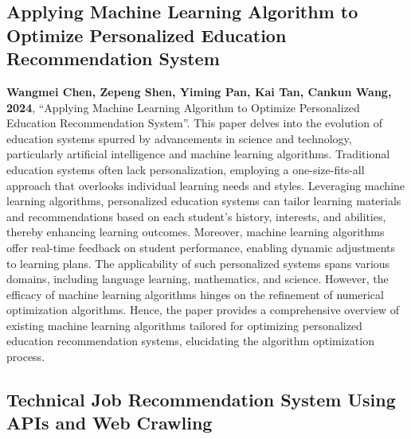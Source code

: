 \subsection{Applying Machine Learning Algorithm to Optimize Personalized Education Recommendation System}

\textbf{Wangmei Chen, Zepeng Shen, Yiming Pan, Kai Tan, Cankun Wang, 2024}, “Applying Machine Learning Algorithm to Optimize Personalized Education Recommendation System”. This paper delves into the evolution of education systems spurred by advancements in science and technology, particularly artificial intelligence and machine learning algorithms. Traditional education systems often lack personalization, employing a one-size-fits-all approach that overlooks individual learning needs and styles. Leveraging machine learning algorithms, personalized education systems can tailor learning materials and recommendations based on each student's history, interests, and abilities, thereby enhancing learning outcomes. Moreover, machine learning algorithms offer real-time feedback on student performance, enabling dynamic adjustments to learning plans. The applicability of such personalized systems spans various domains, including language learning, mathematics, and science. However, the efficacy of machine learning algorithms hinges on the refinement of numerical optimization algorithms. Hence, the paper provides a comprehensive overview of existing machine learning algorithms tailored for optimizing personalized education recommendation systems, elucidating the algorithm optimization process.

\subsection{Technical Job Recommendation System Using APIs and Web Crawling}

